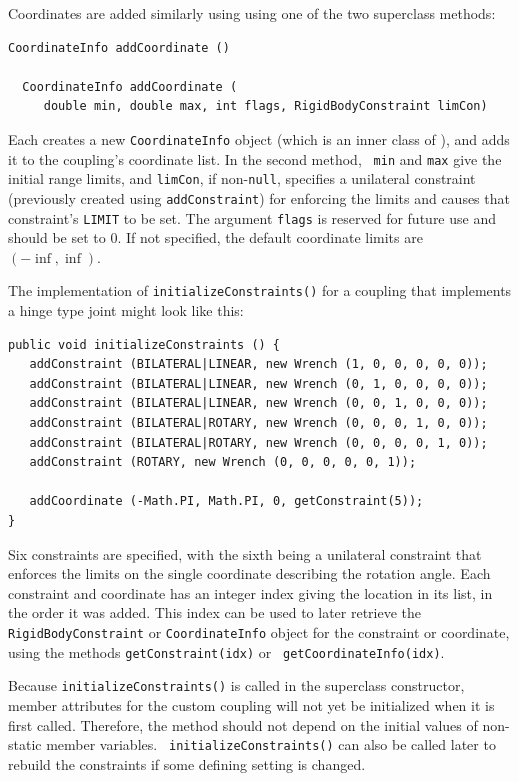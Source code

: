 Coordinates are added similarly using using one of the two superclass
methods:
\begin{lstlisting}[]
  CoordinateInfo addCoordinate ()

  CoordinateInfo addCoordinate (
     double min, double max, int flags, RigidBodyConstraint limCon)
\end{lstlisting}
%
Each creates a new {\tt CoordinateInfo} object (which is an inner
class of ), and
adds it to the coupling's coordinate list. In the second method, {\tt
min} and {\tt max} give the initial range limits, and {\tt limCon}, if
non-{\tt null}, specifies a unilateral constraint (previously created
using {\tt addConstraint}) for enforcing the limits and causes that
constraint's {\tt LIMIT} to be set.  The argument {\tt flags} is
reserved for future use and should be set to 0. If not specified, the
default coordinate limits are $(-\inf, \inf)$.

The implementation of {\tt initializeConstraints()} for a coupling
that implements a hinge type joint might look like this:
%
\begin{lstlisting}[]
public void initializeConstraints () {
   addConstraint (BILATERAL|LINEAR, new Wrench (1, 0, 0, 0, 0, 0));
   addConstraint (BILATERAL|LINEAR, new Wrench (0, 1, 0, 0, 0, 0));
   addConstraint (BILATERAL|LINEAR, new Wrench (0, 0, 1, 0, 0, 0));
   addConstraint (BILATERAL|ROTARY, new Wrench (0, 0, 0, 1, 0, 0));
   addConstraint (BILATERAL|ROTARY, new Wrench (0, 0, 0, 0, 1, 0));
   addConstraint (ROTARY, new Wrench (0, 0, 0, 0, 0, 1));

   addCoordinate (-Math.PI, Math.PI, 0, getConstraint(5));
}
\end{lstlisting}
%
Six constraints are specified, with the sixth being a unilateral
constraint that enforces the limits on the single coordinate
describing the rotation angle.  Each constraint and coordinate has an
integer index giving the location in its list, in the order it was
added. This index can be used to later retrieve the {\tt
RigidBodyConstraint} or {\tt CoordinateInfo} object for the constraint
or coordinate, using the methods {\tt getConstraint(idx)} or {\tt
getCoordinateInfo(idx)}.

\begin{sideblock}
Because {\tt initializeConstraints()} is called in the superclass
constructor, member attributes for the custom coupling will not yet be
initialized when it is first called. Therefore, the method should not
depend on the initial values of non-static member variables.  {\tt
initializeConstraints()} can also be called later to rebuild the
constraints if some defining setting is changed.
\end{sideblock}

